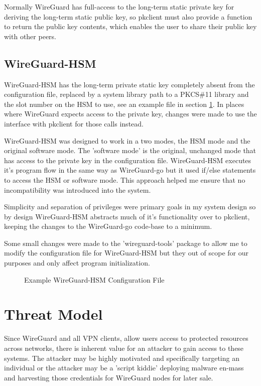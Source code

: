 \documentclass [11pt, proquest] {uwthesis}[2020/02/24]
\begin{document}
Normally WireGuard has full-access to the long-term static private key for deriving the long-term static public key, so pkclient must also provide a function to return the public key contents, which enables the user to share their public key with other peers.


\subsection{WireGuard-HSM}
WireGuard-HSM has the long-term private static key completely absent from the configuration file, replaced by a system library path to a PKCS\#11 library and the slot number on the HSM to use, see an example file in section \ref{fig:wg_hsm_config}.  In places where WireGuard expects access to the private key, changes were made to use the interface with pkclient for those calls instead.

WireGuard-HSM was designed to work in a two modes, the HSM mode and the original software mode. 
The 'software mode' is the original, unchanged mode that has access to the private key in the configuration file. WireGuard-HSM executes it's program flow in the same way as WireGuard-go but it used if/else statements to access the HSM or software mode. This approach helped me ensure that no incompatibility was introduced into the system. 

Simplicity and separation of privileges were primary goals in my system design so by design WireGuard-HSM abstracts much of it's functionality over to pkclient, keeping the changes to the WireGuard-go code-base to a minimum. 

Some small changes were made to the 'wireguard-tools' package to allow me to modify the configuration file for WireGuard-HSM but they out of scope for our purposes and only affect program initialization.

\begin{figure}[ht]
\caption{Example WireGuard-HSM Configuration File}
\label{fig:wg_hsm_config}
\end{figure}

\section{Threat Model}
Since WireGuard and all VPN clients, allow users access to protected resources across networks, there is inherent value for an attacker to gain access to these systems.
The attacker may be highly motivated and specifically targeting an individual or the attacker may be a 'script kiddie' deploying malware en-mass and harvesting those credentials for WireGuard nodes for later sale.
\end{document}
